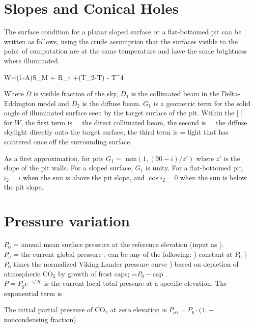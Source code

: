 \documentclass{article}
\def\qH{\mathcal{H}} %
\begin{document}
\section{Slopes and Conical Holes } %
 The surface condition for a planar sloped surface or a flat-bottomed pit can be
 written as follows, using the crude assumption that the surfaces visible to the
 point of computation are at the same temperature and have the same brightness
 where illuminated.

\qbn W=(1-A)S_M   +  \Omega \epsilon R_{\Downarrow t}
+(T_2-T) -  \Omega \epsilon\sigma T^4 \label{eq:pit}\qen

Where $\Omega$ is visible fraction of the sky, $D_1$ is the collimated beam in
the Delta-Eddington model and $D_2$ is the diffuse beam. $G_1$ is a geometric
term for the solid angle of illuminated surface seen by the target surface of
the pit. Within the [ ] for $W$, 
\qi the first term is  = the direct collimated beam,
\qi the second is  = the diffuse skylight directly onto the target
surface,
\qi the third term is  = light that has scattered once off the
surrounding surface.

As a first approximation, for pits $G_1=$ min$( 1, (90-i)/z')$ where $z'$ is the
slope of the pit walls. For a sloped surface, $G_1$ is unity. For a
flat-bottomed pit, $i_2 = i$ when the sun is above the pit slope, and $ \cos i_2
=0$ when the sun is below the pit slope.


\section{Pressure variation} %
$P_0$ = annual mean surface pressure at the reference elevation (input as
 ). 
\\$P_g$ = the current global pressure , can be any of the following: 
) constant at $P_0$
) $P_0$ times the normalized Viking Lander pressure curve 
) based on depletion of atmospheric CO$_2$ by growth of frost caps; =$P_0-$cap .
\\$P=P_g e^{-z/\qH}$  is the current local total pressure at a specific elevation. The exponential term is  

The initial partial pressure of CO$_2$ at zero
elevation is $P_{c0} = P_0 \cdot (1.- $noncondensing fraction). 
\end{document}
